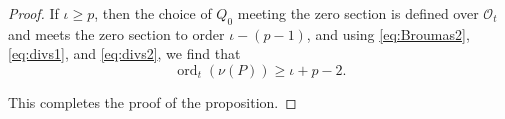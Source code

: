 \documentclass[10pt,a4paper]{amsart}
\DeclareMathOperator{\ord}{ord}
\newcommand{\OO}{\mathcal{O}}
\begin{document}
\begin{proof}
If $\iota\ge p$, then the choice of $Q_0$ meeting the zero section is
defined over $\OO_t$ and meets the zero section to order
$\iota-(p-1)$, and using \eqref{eq:Broumas2}, \eqref{eq:divs1}, and
\eqref{eq:divs2}, we find that
\[\ord_t(\nu(P))\ge \iota+p-2.\]

This completes the proof of the proposition.
\end{proof}
\end{document}
